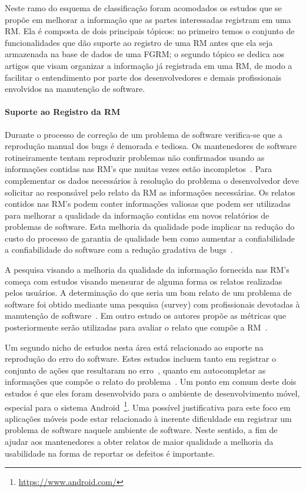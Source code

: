 Neste ramo do esquema de classificação foram acomodados os estudos que se propõe
em melhorar a informação que as partes interessadas registram em uma RM\@. Ela é
composta de dois principais tópicos: no primeiro temos o conjunto de
funcionalidades que dão suporte ao registro de uma RM antes que ela seja
armazenada na base de dados de uma FGRM\@; o segundo tópico se dedica aos artigos
que visam organizar a informação já registrada em uma RM, de modo a facilitar o
entendimento por parte dos desenvolvedores e demais profissionais envolvidos na
manutenção de software.

\paragraph{Suporte ao Registro da RM}

Durante o processo de correção de um problema de software verifica-se que a
reprodução manual dos bugs é demorada e tediosa. Os mantenedores de software
rotineiramente tentam reproduzir problemas não confirmados usando as informações
contidas nas RM's que muitas vezes estão
incompletos~\cite{White:2015:GRR:2820282.2820291}. Para complementar os dados
necessários à resolução do problema o desenvolvedor deve solicitar ao
responsável pelo relato da RM as informações necessárias. Os relatos
contidos nas RM's podem conter informações valiosas que podem ser
utilizadas para melhorar a qualidade da informação contidas em novos relatórios
de problemas de software. Esta melhoria da qualidade pode implicar na redução do
custo do processo de garantia de qualidade bem como aumentar a
confiabilidade a confiabilidade do software com a redução gradativa de
bugs~\cite{Tu:2014:MQI:2677832.2677844}.

A pesquisa visando a melhoria da qualidade da informação fornecida nas RM's
começa com estudos visando mensurar de alguma forma os relatos realizadas pelos
usuários. A determinação do que seria um bom relato de um problema de software
foi obtido mediante uma pesquisa (survey) com profissionais devotadas à
manutenção de software~\cite{Bettenburg2008a}. Em outro estudo os autores propõe
as métricas que posteriormente serão utilizadas para avaliar o relato que compõe
a RM~\cite{Tu:2014:MQI:2677832.2677844}.

Um segundo nicho de estudos  nesta área está relacionado ao suporte na
reprodução do erro do software. Estes estudos incluem tanto em registrar o
conjunto de ações que resultaram no erro~\cite{White:2015:GRR:2820282.2820291},
quanto em autocompletar as informações que compõe o relato do
problema~\cite{moran2015auto}. Um ponto em comum deste dois estudos é que eles
foram desenvolvido para o ambiente de desenvolvimento móvel, especial para o
sistema Android~\footnote{\url{https://www.android.com/}}. Uma possível
justificativa para este foco em aplicações móveis pode estar relacionado à
inerente dificuldade em registrar um problema de software naquele ambiente de
software. Neste sentido, a fim de ajudar aos mantenedores a obter relatos de
maior qualidade a melhoria da usabilidade na forma de reportar os defeitos é
importante.

